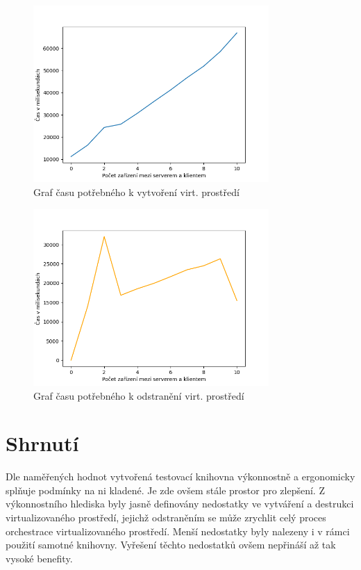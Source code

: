 \begin{figure}[htbp]
    \centering 
    \includegraphics[width=0.8\textwidth]{assets/img/graphs/graph_start.png}
    \caption{Graf času potřebného k vytvoření virt. prostředí}
    \label{fig:graph_create}
\end{figure}



\begin{figure}[htbp]
    \centering 
    \includegraphics[width=0.8\textwidth]{assets/img/graphs/graph_remove.png}
    \caption{Graf času potřebného k odstranění virt. prostředí}
    \label{fig:graph_remove}
\end{figure}


\section{Shrnutí}

Dle naměřených hodnot vytvořená testovací knihovna výkonnostně a ergonomicky splňuje podmínky na ni kladené. Je zde ovšem stále prostor pro zlepšení. Z výkonnostního hlediska byly jasně definovány nedostatky ve vytváření a destrukci virtualizovaného prostředí, jejichž odstraněním se může zrychlit celý proces orchestrace virtualizovaného prostředí. Menší nedostatky byly nalezeny i v rámci použití samotné knihovny. Vyřešení těchto nedostatků ovšem nepřináší až tak vysoké benefity.



